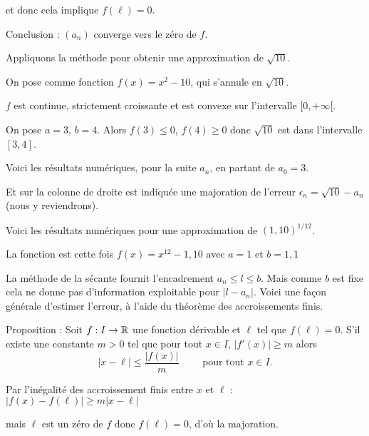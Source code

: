 et donc cela implique $f(\ell)=0$.
  
  
  Conclusion : $(a_n)$ converge vers le zéro de $f$.
  
\diapo

Appliquons la méthode pour obtenir une approximation de $\sqrt{10}$.

\change

On pose comme fonction  $f(x)=x^2-10$, qui s'annule en $\sqrt{10}$.


$f$ est continue, strictement croissante et est convexe sur l'intervalle $[0,+\infty[$.

\change

On pose $a=3$, $b=4$. Alors $f(3) \le 0$, $f(4) \ge 0$ donc $\sqrt{10}$ est dans l'intervalle $[3,4]$.

\change

Voici les résultats numériques,
pour la suite $a_n$, en partant de $a_0=3$.

Et sur la colonne de droite est indiquée
une majoration de l'erreur $\epsilon_n = \sqrt{10}-a_n$ (nous y reviendrons).


\diapo

Voici les résultats numériques 
pour une approximation de $(1,10)^{1/12}$.

La fonction est cette fois $f(x) = x^{12} - 1,10$ avec $a=1$ et $b=1,1$

\diapo


La méthode de la sécante fournit l'encadrement $a_n \le l \le b$.
Mais comme $b$ est fixe cela ne donne pas d'information exploitable pour $|l-a_n|$.
Voici une façon générale d'estimer l'erreur, à l'aide du théorème des accroissements finis.

Proposition :
 Soit $f : I \to \mathbb{R}$ une fonction dérivable et $\ell$ tel que $f(\ell)=0$.
 S'il existe une constante $m>0$ tel que pour tout $x\in I$, $|f'(x)| \ge m$ alors
 $$|x-\ell| \le \frac{|f(x)|}{m} \qquad \text{ pour tout } x \in I.$$

 \change
 
  Par l'inégalité des accroissement finis entre $x$ et $\ell$ :
  $|f(x)-f(\ell)| \ge m |x-\ell|$
  
  mais $\ell$ est un zéro de $f$ donc $f(\ell)=0$, d'où la majoration.



\diapo


